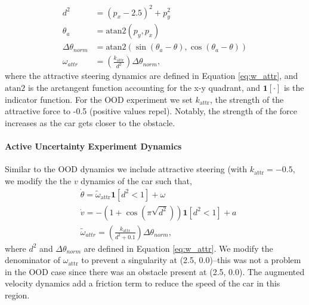 \documentclass{l4dc2026}
\def\1{\bm{1}}
\begin{document}
\begin{subequations}\label{eq:w_attr}
\begin{align}
    d^2 &= (p_x - 2.5)^2 + p_y^2 \\
    \theta_{a} &= \text{atan2}(p_y,p_x) \\
    \Delta\theta_{norm} &= \text{atan2}(\sin(\theta_{a} - \theta), \cos(\theta_{a} - \theta)) \\
    \omega_{attr} &= \left( \frac{k_\text{attr}}{d^2} \right) \Delta\theta_{norm},
\end{align}
\end{subequations}
where the attractive steering dynamics are defined in Equation \ref{eq:w_attr}, and $\text{atan2}$ is the arctangent function accounting for the x-y quadrant, and $\1[\cdot]$ is the indicator function. For the OOD experiment we set $k_\text{attr}$, the strength of the attractive force to -0.5 (positive values repel). Notably, the strength of the force increases as the car gets closer to the obstacle. 

\paragraph{Active Uncertainty Experiment Dynamics} Similar to the OOD dynamics we include attractive steering (with $k_\text{attr} = -0.5$, we modify the the $v$ dynamics of the car such that, 
\begin{subequations}
    \begin{align}
    &\dot\theta = \tilde{\omega}_\text{attr}\1[d^2 < 1] + \omega \\
    &\dot v =  -(1 + \cos(\pi \sqrt{d^2}))\1[d^2 < 1]+ a \\
    &\tilde\omega_{attr} = \left( \frac{k_\text{attr}}{d^2 + 0.1} \right) \Delta\theta_{norm},
    \end{align}
\end{subequations}
where $d^2$ and $\Delta\theta_{norm}$ are defined in Equation \ref{eq:w_attr}. We modify the denominator of $\omega_\text{attr}$ to prevent a singularity at (2.5, 0.0)--this was not a problem in the OOD case since there was an obstacle present at (2.5, 0.0). The augmented velocity dynamics add a friction term to reduce the speed of the car in this region.
\end{document}
